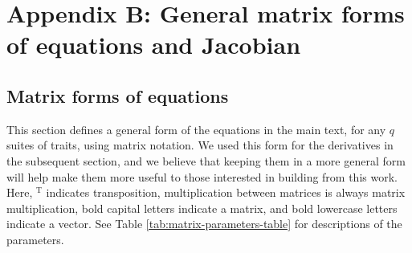 
\renewcommand{\thefigure}{B\arabic{displayFigure}}
\renewcommand{\theequation}{B\arabic{displayEquation}}
\renewcommand{\thetable}{B\arabic{displayTable}}
\setcounter{displayFigure}{0}
\setcounter{displayEquation}{0}
\setcounter{displayTable}{0}


\section*{Appendix B: General matrix forms of equations and Jacobian}


\subsection*{Matrix forms of equations}


This section defines a general form of the equations in the main text, 
for any $q$ suites of traits, using matrix notation.
We used this form for the derivatives in the subsequent section, and 
we believe that keeping them in a more general form will help make them 
more useful to those interested in building from this work.
Here, $^{\textrm{T}}$ indicates transposition,
multiplication between matrices is always matrix multiplication,
bold capital letters indicate a matrix, and bold lowercase letters indicate 
a vector.
See Table \ref{tab:matrix-parameters-table} for descriptions of the parameters.




